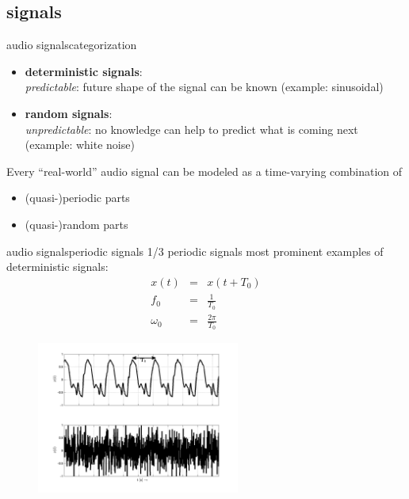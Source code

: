         \subsection{signals}

\begin{frame}{audio signals}{categorization}
	\begin{itemize}
		\item	\textbf{deterministic signals}:\\
				\textit{predictable}: future shape of the signal can be known (example: sinusoidal)
		\pause		
		\item	\textbf{random signals}:\\
				\textit{unpredictable}: no knowledge can help to predict what is coming next (example: white noise)
	\end{itemize}
	
	Every ``real-world'' audio signal can be modeled as a time-varying combination of 
	\begin{itemize}
		\item	(quasi-)periodic parts
		\item	(quasi-)random parts
	\end{itemize}
\end{frame}

\begin{frame}{audio signals}{periodic signals 1/3}
	\vspace{-5mm}
    periodic signals most prominent examples of deterministic signals: 
	\begin{eqnarray}
		x(t) 	&=& x(t+T_0)\nonumber\\
		f_0 	&=& \frac{1}{T_0}\nonumber\\
		\omega_0&=& \frac{2\pi}{T_0}\nonumber
	\end{eqnarray}
	\vspace{-10mm}
	\pause
	
	\begin{figure}
		\centering
			\includegraphics[height=5cm,width=\textwidth]{graph/periodic}
	\end{figure}
\end{frame}

